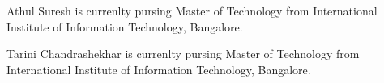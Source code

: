 \documentclass[journal]{IEEEtran}
\begin{document}

\begin{IEEEbiography}{Athul Suresh}
is currenlty pursing Master of Technology from International Institute of Information Technology, Bangalore. 
\end{IEEEbiography}

\begin{IEEEbiography}{Tarini Chandrashekhar}
is currenlty pursing Master of Technology from International Institute of Information Technology, Bangalore. 

\end{IEEEbiography}
\end{document}
